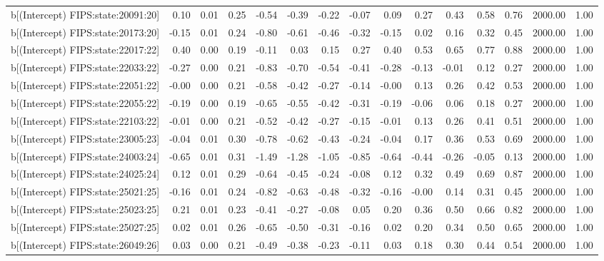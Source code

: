 \begin{table}[ht]
\begin{tabular}{rrrrrrrrrrrrrrr}
  b[(Intercept) FIPS:state:20091:20] & 0.10 & 0.01 & 0.25 & -0.54 & -0.39 & -0.22 & -0.07 & 0.09 & 0.27 & 0.43 & 0.58 & 0.76 & 2000.00 & 1.00 \\ 
  b[(Intercept) FIPS:state:20173:20] & -0.15 & 0.01 & 0.24 & -0.80 & -0.61 & -0.46 & -0.32 & -0.15 & 0.02 & 0.16 & 0.32 & 0.45 & 2000.00 & 1.00 \\ 
  b[(Intercept) FIPS:state:22017:22] & 0.40 & 0.00 & 0.19 & -0.11 & 0.03 & 0.15 & 0.27 & 0.40 & 0.53 & 0.65 & 0.77 & 0.88 & 2000.00 & 1.00 \\ 
  b[(Intercept) FIPS:state:22033:22] & -0.27 & 0.00 & 0.21 & -0.83 & -0.70 & -0.54 & -0.41 & -0.28 & -0.13 & -0.01 & 0.12 & 0.27 & 2000.00 & 1.00 \\ 
  b[(Intercept) FIPS:state:22051:22] & -0.00 & 0.00 & 0.21 & -0.58 & -0.42 & -0.27 & -0.14 & -0.00 & 0.13 & 0.26 & 0.42 & 0.53 & 2000.00 & 1.00 \\ 
  b[(Intercept) FIPS:state:22055:22] & -0.19 & 0.00 & 0.19 & -0.65 & -0.55 & -0.42 & -0.31 & -0.19 & -0.06 & 0.06 & 0.18 & 0.27 & 2000.00 & 1.00 \\ 
  b[(Intercept) FIPS:state:22103:22] & -0.01 & 0.00 & 0.21 & -0.52 & -0.42 & -0.27 & -0.15 & -0.01 & 0.13 & 0.26 & 0.41 & 0.51 & 2000.00 & 1.00 \\ 
  b[(Intercept) FIPS:state:23005:23] & -0.04 & 0.01 & 0.30 & -0.78 & -0.62 & -0.43 & -0.24 & -0.04 & 0.17 & 0.36 & 0.53 & 0.69 & 2000.00 & 1.00 \\ 
  b[(Intercept) FIPS:state:24003:24] & -0.65 & 0.01 & 0.31 & -1.49 & -1.28 & -1.05 & -0.85 & -0.64 & -0.44 & -0.26 & -0.05 & 0.13 & 2000.00 & 1.00 \\ 
  b[(Intercept) FIPS:state:24025:24] & 0.12 & 0.01 & 0.29 & -0.64 & -0.45 & -0.24 & -0.08 & 0.12 & 0.32 & 0.49 & 0.69 & 0.87 & 2000.00 & 1.00 \\ 
  b[(Intercept) FIPS:state:25021:25] & -0.16 & 0.01 & 0.24 & -0.82 & -0.63 & -0.48 & -0.32 & -0.16 & -0.00 & 0.14 & 0.31 & 0.45 & 2000.00 & 1.00 \\ 
  b[(Intercept) FIPS:state:25023:25] & 0.21 & 0.01 & 0.23 & -0.41 & -0.27 & -0.08 & 0.05 & 0.20 & 0.36 & 0.50 & 0.66 & 0.82 & 2000.00 & 1.00 \\ 
  b[(Intercept) FIPS:state:25027:25] & 0.02 & 0.01 & 0.26 & -0.65 & -0.50 & -0.31 & -0.16 & 0.02 & 0.20 & 0.34 & 0.50 & 0.65 & 2000.00 & 1.00 \\ 
  b[(Intercept) FIPS:state:26049:26] & 0.03 & 0.00 & 0.21 & -0.49 & -0.38 & -0.23 & -0.11 & 0.03 & 0.18 & 0.30 & 0.44 & 0.54 & 2000.00 & 1.00 \\ 

\end{tabular}
\end{table}
